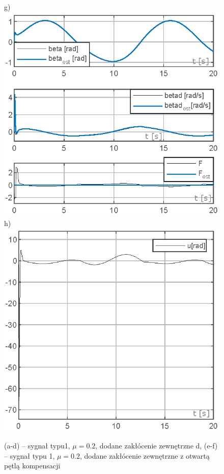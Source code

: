 \documentclass[10pt, a4paper]{article}
\begin{document}
\begin{figure}[ht]
	g) \includegraphics[width=0.22\columnwidth]{ACex6/figs/FIG3_b_tconst_dON_otwartapetla_sin_mi0.2/StateVar_dON_otwartapetla_tconst_mi0.2}
	h) \includegraphics[width=0.22\columnwidth]{ACex6/figs/FIG3_b_tconst_dON_otwartapetla_sin_mi0.2/U_dON_otwartapetla_tconst_mi0.2}\\
	\caption{(a-d) – sygnał typu1, $\mu =0.2$, dodane zakłócenie zewnętrzne d, (e-f) – sygnał typu 1, $\mu =0.2$, dodane zakłócenie zewnętrzne z otwartą pętlą kompensacji
	}
\end{figure}
\end{document}
